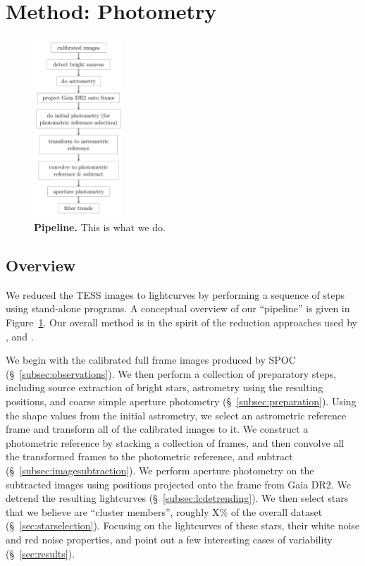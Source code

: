 \documentclass[12pt,twocolumn,tighten]{aastex62}
\begin{document}
\section{Method: Photometry}
\label{sec:method}

\begin{figure}[t]
	\begin{center}
		\leavevmode
		\includegraphics[width=0.3\textwidth]{f2.pdf}
	\end{center}
	\vspace{-0.5cm}
	\caption{
    {\bf Pipeline.} This is what we do.
		\label{fig:pipeline}
	}
\end{figure}

\subsection{Overview}

We reduced the TESS images to lightcurves by performing a sequence of
steps using stand-alone programs.  A conceptual overview of our
``pipeline'' is given in Figure~\ref{fig:pipeline}.  
Our overall method is in the spirit of the reduction approaches used
by \citet{Pal_2009}, \citet{soares-furtado_image_2017} and
\citet{oelkers_precision_2018}.

We begin with the calibrated full frame images produced by SPOC
(\S~\ref{subsec:observations}).  We then perform a collection of
preparatory steps, including source extraction of bright stars,
astrometry using the resulting positions, and coarse simple aperture
photometry (\S~\ref{subsec:preparation}).  Using the shape values from
the initial astrometry, we select an astrometric reference frame and
transform all of the calibrated images to it.  We construct a
photometric reference by stacking a collection of frames, and then
convolve all the transformed frames to the photometric reference,
and subtract (\S~\ref{subsec:imagesubtraction}).  We perform aperture
photometry on the subtracted images using positions projected onto the
frame from Gaia DR2.  We detrend the resulting lightcurves
(\S~\ref{subsec:lcdetrending}).
We then select stars that we believe are ``cluster members'',
roughly X\% of the overall dataset (\S~\ref{sec:starselection}).
Focusing on the lightcurves of these stars, their white noise and red
noise properties, and point out a few interesting cases of
variability (\S~\ref{sec:results}).
\end{document}
